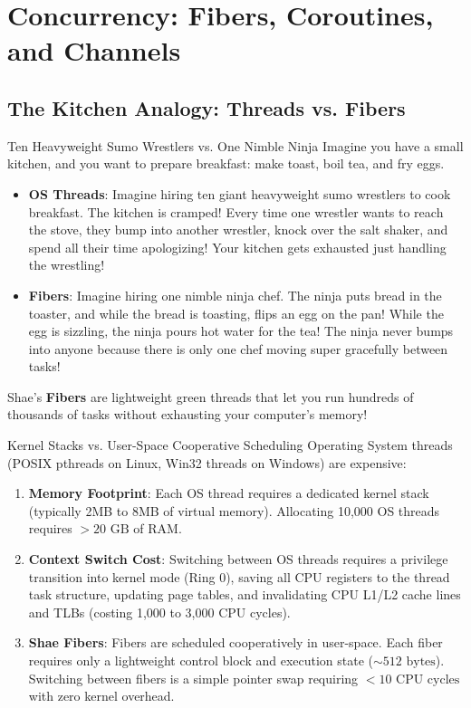 \chapter{Concurrency: Fibers, Coroutines, and Channels}

\section{The Kitchen Analogy: Threads vs. Fibers}

\begin{kidbox}{Ten Heavyweight Sumo Wrestlers vs. One Nimble Ninja}
Imagine you have a small kitchen, and you want to prepare breakfast: make toast, boil tea, and fry eggs.
\begin{itemize}
    \item \textbf{OS Threads}: Imagine hiring ten giant heavyweight sumo wrestlers to cook breakfast. The kitchen is cramped! Every time one wrestler wants to reach the stove, they bump into another wrestler, knock over the salt shaker, and spend all their time apologizing! Your kitchen gets exhausted just handling the wrestling!
    \item \textbf{Fibers}: Imagine hiring one nimble ninja chef. The ninja puts bread in the toaster, and while the bread is toasting, flips an egg on the pan! While the egg is sizzling, the ninja pours hot water for the tea! The ninja never bumps into anyone because there is only one chef moving super gracefully between tasks!
\end{itemize}
Shae's \textbf{Fibers} are lightweight green threads that let you run hundreds of thousands of tasks without exhausting your computer's memory!
\end{kidbox}

\begin{deepbox}{Kernel Stacks vs. User-Space Cooperative Scheduling}
Operating System threads (POSIX pthreads on Linux, Win32 threads on Windows) are expensive:
\begin{enumerate}
    \item \textbf{Memory Footprint}: Each OS thread requires a dedicated kernel stack (typically 2MB to 8MB of virtual memory). Allocating 10,000 OS threads requires $>20\text{ GB}$ of RAM.
    \item \textbf{Context Switch Cost}: Switching between OS threads requires a privilege transition into kernel mode (Ring 0), saving all CPU registers to the thread task structure, updating page tables, and invalidating CPU L1/L2 cache lines and TLBs (costing 1,000 to 3,000 CPU cycles).
    \item \textbf{Shae Fibers}: Fibers are scheduled cooperatively in user-space. Each fiber requires only a lightweight control block and execution state ($\sim 512\text{ bytes}$). Switching between fibers is a simple pointer swap requiring $<10\text{ CPU cycles}$ with zero kernel overhead.
\end{enumerate}
\end{deepbox}


